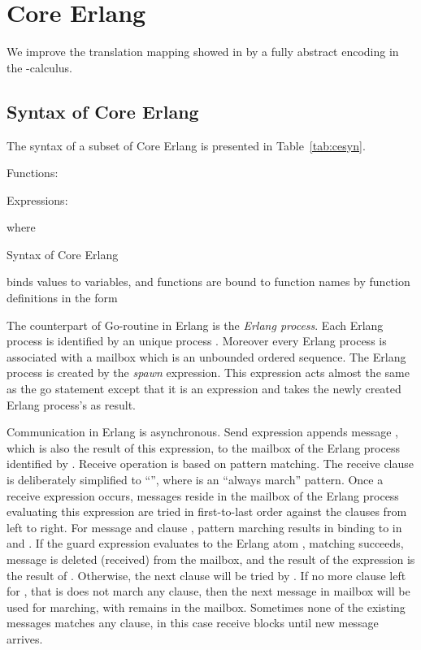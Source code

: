 \documentclass[runningheads, envcountsame, a4paper]{llncs}
\begin{document}
\section{Core Erlang}
\label{sec:erlang}
We improve the translation mapping showed in \cite{Noll2005} by a fully abstract encoding in the -calculus.

\subsection{Syntax of Core Erlang}
\label{sec:erlsyn}
The syntax of a subset of Core Erlang is presented in Table~\ref{tab:cesyn}.

\begin{table}
Functions:

Expressions:

where

\caption{Syntax of Core Erlang}
\label{tab:cesyn}
\end{table}

 binds values to variables, and functions are bound to function names by function definitions in the form


The counterpart of Go-routine in Erlang is the \emph{Erlang process}.
Each Erlang process is identified by an unique process .
Moreover every Erlang process is associated with a mailbox which is an unbounded ordered sequence.
The Erlang process is created by the \emph{spawn} expression.
This expression acts almost the same as the go statement except that
it is an expression and takes the newly created Erlang process's  as result.

Communication in Erlang is asynchronous.
Send expression  appends message , which is also the result of this expression,
to the mailbox of the Erlang process identified by .
Receive operation is based on pattern matching.
The receive clause is deliberately simplified to ``'', where  is an ``always march'' pattern.
Once a receive expression occurs, messages reside in the mailbox of the Erlang process evaluating this expression
are tried in first-to-last order against the clauses  from left to right.
For message  and clause , pattern marching results in  binding to  in  and .
If the guard expression  evaluates to the Erlang atom , matching succeeds,
message  is deleted (received) from the mailbox, and the result of the expression is the result of .
Otherwise, the next clause will be tried by .
If no more clause left for , that is  does not march any clause, then the next message
in mailbox will be used for marching, with  remains in the mailbox.
Sometimes none of the existing messages matches any clause, in this case receive blocks until new message arrives.
\end{document}
